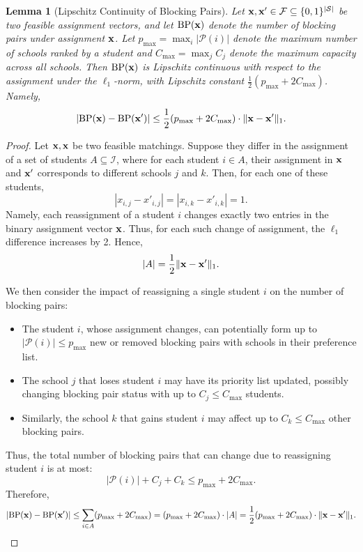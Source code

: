 \documentclass[11pt]{article}
\newtheorem{lemma}{Lemma}
\begin{document}
\begin{lemma}[Lipschitz Continuity of Blocking Pairs]\label{lem:lipschitz-bp-x}
Let \( {\bf x}, {\bf x}' \in \mathcal{F} \subseteq \{0,1\}^{|\mathcal{S}|} \) be two feasible assignment vectors, and let \( \textnormal{BP}({\bf x}) \) denote the number of blocking pairs under assignment \( {\bf x} \). Let $p_{\max} = \max_i |\mathcal{P}(i)|$ denote the maximum number of schools ranked by a student and $C_{\max} = \max_j C_j$ denote the maximum capacity across all schools.
Then \( \textnormal{BP}({\bf x}) \) is Lipschitz continuous with respect to the assignment under the \( \ell_1 \)-norm, with Lipschitz constant \( \frac{1}{2}(p_{\max} + 2C_{\max}) \). Namely, 
\[
\left| \textnormal{BP}({\bf x}) - \textnormal{BP}({\bf x}') \right|
\leq  \frac{1}{2}(p_{\max} + 2C_{\max}) \cdot \| {\bf x} - {\bf x}' \|_1.
\]
\end{lemma}
\begin{proof}
Let \( {\bf x}, {\bf x} \) be two feasible matchings. Suppose they differ in the assignment of a set of students \( A \subseteq \mathcal{I} \), where for each student \( i \in A \), their assignment in \( {\bf x} \) and \( {\bf x}' \) corresponds to different schools $j$ and $k$. Then, for each one of these students, 
$$|x_{i,j} - x'_{i,j}| = |x_{i,k} - x'_{i,k}| = 1.$$
Namely, each reassignment of a student \( i \) changes exactly two entries in the binary assignment vector \( {\bf x} \). Thus, for each such change of assignment, the \( \ell_1 \) difference increases by 2. Hence,
\[
|A| = \frac{1}{2} \| {\bf x} - {\bf x}' \|_1.
\]

We then consider the impact of reassigning a single student \( i \) on the number of blocking pairs:
\begin{itemize}
    \item The student \( i \), whose assignment changes, can potentially form up to \( |\mathcal{P}(i)| \leq p_{\max} \) new or removed blocking pairs with schools in their preference list.
    \item The school \( j \) that loses student \( i \) may have its priority list updated, possibly changing blocking pair status with up to \( C_{j} \leq C_{\max} \) students.
    \item Similarly, the school \( k \) that gains student \( i \) may affect up to \( C_{k} \leq C_{\max} \) other blocking pairs.
\end{itemize}
Thus, the total number of blocking pairs that can change due to reassigning student \( i \) is at most:
\[
|\mathcal{P}(i)|  + C_{j} + C_{k} \leq  p_{\max} + 2C_{\max}.
\]
Therefore, 
\[
| \text{BP}({\bf x}) - \text{BP}({\bf x}') | \leq \sum_{i \in A} ( p_{\max} + 2C_{\max}) = ( p_{\max}  + 2C_{\max}) \cdot |A| = \frac{1}{2} ( p_{\max} + 2C_{\max}) \cdot \| {\bf x} - {\bf x}' \|_1.
\]
\end{proof}
\end{document}
